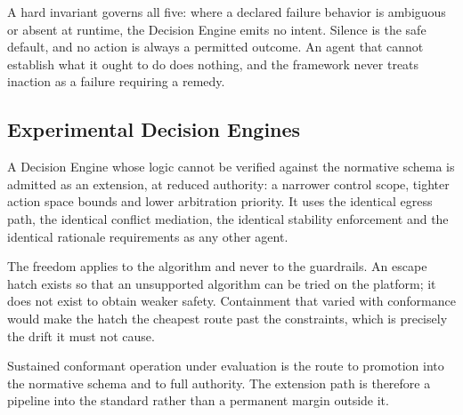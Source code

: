 A hard invariant governs all five: where a declared failure behavior is
ambiguous or absent at runtime, the Decision Engine emits no intent.
Silence is the safe default, and no action is always a permitted
outcome. An agent that cannot establish what it ought to do does
nothing, and the framework never treats inaction as a failure requiring
a remedy.

\hypertarget{experimental-decision-engines}{%
\subsection{Experimental Decision Engines}\label{experimental-decision-engines}}

A Decision Engine whose logic cannot be verified against the normative
schema is admitted as an extension, at reduced authority: a narrower
control scope, tighter action space bounds and lower arbitration
priority. It uses the identical egress path, the identical conflict
mediation, the identical stability enforcement and the identical
rationale requirements as any other agent.

The freedom applies to the algorithm and never to the guardrails. An
escape hatch exists so that an unsupported algorithm can be tried on the
platform; it does not exist to obtain weaker safety. Containment that
varied with conformance would make the hatch the cheapest route past the
constraints, which is precisely the drift it must not cause.

Sustained conformant operation under evaluation is the route to
promotion into the normative schema and to full authority. The extension
path is therefore a pipeline into the standard rather than a permanent
margin outside it.

